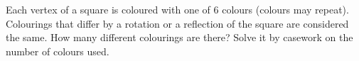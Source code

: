 Each vertex of a square is coloured with one of $6$ colours (colours may repeat). Colourings that differ by a rotation or a reflection of the square are considered the same. How many different colourings are there? Solve it by casework on the number of colours used.
